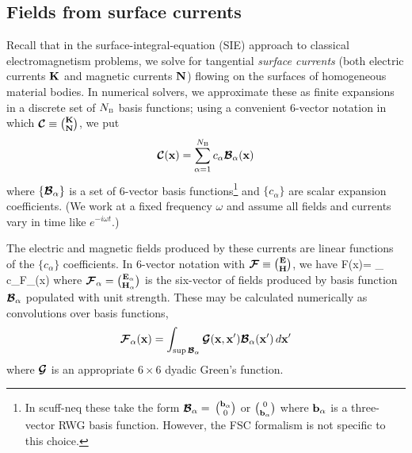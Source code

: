 \documentclass[letterpaper]{article}
\begin{document}
\subsection*{Fields from surface currents}

Recall that in the surface-integral-equation (SIE) approach to
classical electromagnetism problems, we solve for tangential
\textit{surface currents} (both electric currents $\mathbf{K}$ 
and magnetic currents $\mathbf{N}$) flowing on the surfaces of 
homogeneous material bodies. In numerical solvers, we 
approximate these as finite expansions in a discrete set
of $N_{\hbox{\tiny{B}}}$ basis functions; using a convenient 6-vector notation 
in which $\boldsymbol{\mathcal{C}}\equiv {\mathbf{K} \choose \mathbf{N}}$, we put
$$ \boldsymbol{\mathcal{C}}(\mathbf{x})=\sum_{\alpha=1}^{N_{\hbox{\tiny{B}}}} 
   c_\alpha \boldsymbol{\mathcal{B}}_\alpha(\mathbf{x}) 
$$ 
where $\{\boldsymbol{\mathcal{B}}_\alpha\}$ is a set of 6-vector basis 
functions\footnote{In {\sc scuff-neq} these take the form
$\boldsymbol{\mathcal{B}}_\alpha=$ 
$\mathbf{b}_\alpha \choose 0$ 
or 
$0 \choose \mathbf{b}_\alpha$
where $\mathbf{b}_\alpha$ is a three-vector RWG basis function.
However, the FSC formalism is not specific to this choice.}
and $\{c_\alpha\}$ are scalar expansion coefficients.
(We work at a fixed frequency $\omega$ and assume all fields
and currents vary in time like $e^{-i\omega t}$.)

The electric and magnetic fields produced by these currents
are linear functions of the $\{c_\alpha\}$ coefficients.
In 6-vector notation with $\boldsymbol{\mathcal{F}}\equiv {\mathbf{E} \choose \mathbf{H}}$, we have
{ \bmc F(\vb x)=
   \sum_{\alpha} c_\alpha \bmc F_\alpha(\vb x)
}
where $\boldsymbol{\mathcal{F}}_\alpha={\mathbf{E}_\alpha \choose \mathbf{H}_\alpha}$ 
is the six-vector of fields produced by basis function $\boldsymbol{\mathcal{B}}_\alpha$ 
populated with unit strength. These may be calculated numerically
as convolutions over basis functions,
$$ \boldsymbol{\mathcal{F}}_\alpha(\mathbf{x})
   =\int_{\sup \boldsymbol{\mathcal{B}}_\alpha} \boldsymbol{\mathcal{G}}(\mathbf{x}, \mathbf{x}^\prime)
    \boldsymbol{\mathcal{B}}_\alpha(\mathbf{x}^\prime) \, d\mathbf{x}^\prime
$$
where $\boldsymbol{\mathcal{G}}$ is an appropriate $6\times 6$ dyadic Green's
function.
\end{document}
